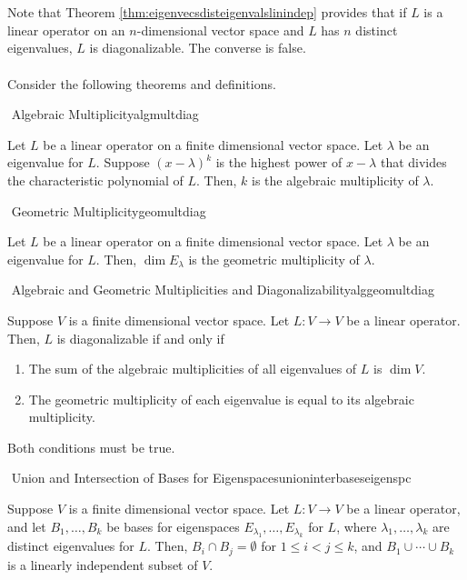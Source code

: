         \vphantom
        \\
        \\
        Note that Theorem \ref{thm:eigenvecsdisteigenvalslinindep} provides that if \(L\) is a linear operator on an \(n\)-dimensional vector space and \(L\) has \(n\) distinct eigenvalues, \(L\) is diagonalizable. The converse is false.
        \pagebreak
        \\
        \\
        Consider the following theorems and definitions.
        \begin{definition}{\Stop\,\,Algebraic Multiplicity}{algmultdiag}
            
            Let \(L\) be a linear operator on a finite dimensional vector space. Let \(\lambda\) be an eigenvalue for \(L\). Suppose \((x-\lambda)^k\) is the highest power of \(x-\lambda\) that divides the characteristic polynomial of \(L\). Then, \(k\) is the algebraic multiplicity of \(\lambda\).

        \end{definition}
        \begin{definition}{\Stop\,\,Geometric Multiplicity}{geomultdiag}
            
            Let \(L\) be a linear operator on a finite dimensional vector space. Let \(\lambda\) be an eigenvalue for \(L\). Then, \(\dim E_\lambda\) is the geometric multiplicity of \(\lambda\).

        \end{definition}
        \begin{theorem}{\Stop\,\,Algebraic and Geometric Multiplicities and Diagonalizability}{alggeomultdiag}

            Suppose \(V\) is a finite dimensional vector space. Let \(L:V\to V\) be a linear operator. Then, \(L\) is diagonalizable if and only if
            \begin{enumerate}
                \item The sum of the algebraic multiplicities of all eigenvalues of \(L\) is \(\dim V\).
                \item The geometric multiplicity of each eigenvalue is equal to its algebraic multiplicity.
            \end{enumerate}
            Both conditions must be true.

        \end{theorem}
        \begin{theorem}{\Stop\,\,Union and Intersection of Bases for Eigenspaces}{unioninterbaseseigenspc}

            Suppose \(V\) is a finite dimensional vector space. Let \(L:V\to V\) be a linear operator, and let \(B_1,\ldots,B_k\) be bases for eigenspaces \(E_{\lambda_1},\ldots,E_{\lambda_k}\) for \(L\), where \(\lambda_1,\ldots,\lambda_k\) are distinct eigenvalues for \(L\). Then, \(B_i\cap B_j=\emptyset\) for \(1\leq i<j\leq k\), and \(B_1\cup \cdots\cup B_k\) is a linearly independent subset of \(V\).
            
        \end{theorem}
